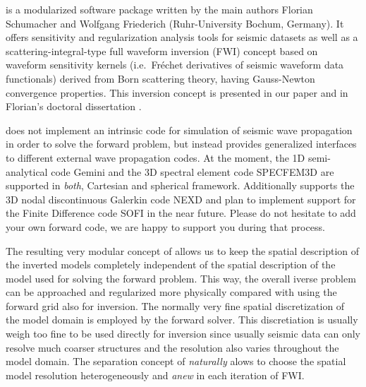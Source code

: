 
%
%
%
\ASKI{} is a modularized software package written by the main authors Florian Schumacher and
Wolfgang Friederich (Ruhr-University Bochum, Germany). It offers sensitivity and regularization 
analysis tools for seismic datasets
as well as a scattering-integral-type full waveform inversion (FWI) concept based on waveform sensitivity 
kernels (i.e.\ Fr\'echet derivatives of seismic waveform data functionals) derived from Born scattering theory,
having Gauss-Newton convergence properties.
This inversion concept is presented in our paper \cite{Schumacher16} and in Florian's doctoral
dissertation \cite{_743d334d-dfa4-4a16-8cc5-91cdadc95271}.

\ASKI{} does not implement an intrinsic code for simulation of seismic wave propagation in order to 
solve the forward problem, but instead provides generalized interfaces to different external wave 
propagation codes. At the moment, the 1D semi-analytical code Gemini \cite{friederich_wd1995} and the 3D spectral 
element code SPECFEM3D \cite{TrKoLi08} are supported in \emph{both}, Cartesian and spherical framework. 
Additionally \ASKI{} supports the 3D nodal discontinuous Galerkin code NEXD \cite{Lambrecht.2015}
and plan to implement support for the Finite Difference code SOFI \cite{bohlen2002parallel}
in the near future. 
Please do not hesitate to add your own forward code, we are happy to support you during that process.

The resulting very modular concept of \ASKI{} allows us to keep the spatial description of the inverted 
models completely independent of the spatial description of the model used for solving the forward 
problem. This way, the overall iverse problem can be approached and regularized more physically compared
with using the forward grid also for inversion. The normally very fine spatial discretization of the model
domain is employed by the forward solver. This discretiation is usually weigh too fine to be used
directly for inversion since usually seismic data can only resolve much coarser structures and the
resolution also varies throughout the model domain. 
The separation concept of \ASKI{} \emph{naturally} alows to choose the spatial model
resolution heterogeneously and \emph{anew} in each iteration of FWI.

